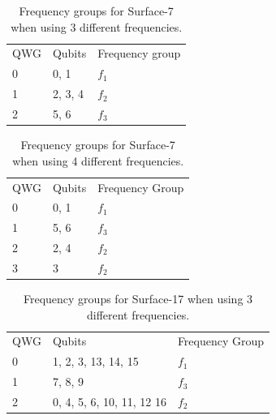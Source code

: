 \begin{table}[h!]


\caption{\label{T1}
Frequency groups for Surface-7 when using 3 different frequencies. }
\centering

\begin{tabular}{lll}
 & \\
\hline
QWG & Qubits & Frequency group\\
\hline
\cellcolor{red!25}  0 & \cellcolor{red!25} 0, 1 & \cellcolor{red!25} $f_1$\\
\cellcolor{Aquamarine!25}  1 & \cellcolor{Aquamarine!25} 2, 3, 4 & \cellcolor{Aquamarine!25} $f_2$\\
\cellcolor{pink!25}  2 & \cellcolor{pink!25} 5, 6 & \cellcolor{pink!25} $f_3$\\

\hline
\end{tabular}
\end{table}

 
 \begin{table}[h!]


\caption{\label{T2}
Frequency groups for Surface-7 when using 4 different frequencies.}
\centering
\begin{tabular}{lll}
 & \\
\hline
QWG & Qubits & Frequency Group\\
\hline
\cellcolor{red!25}  0 & \cellcolor{red!25} 0, 1 & \cellcolor{red!25} $f_1$ \\
\cellcolor{pink!25}  1 & \cellcolor{pink!25} 5, 6 & \cellcolor{pink!25} $f_3$ \\
\cellcolor{green!25}  2 & \cellcolor{green!25} 2, 4 & \cellcolor{green!25} $f_2$ \\
\cellcolor{cyan!25}  3 & \cellcolor{cyan!25} 3 & \cellcolor{cyan!25} $f_2$ \\
\hline
\end{tabular}
\end{table}
 
 
 





\begin{table}[h!]

\caption{\label{T4}
Frequency groups for Surface-17 when using 3 different frequencies.}
\centering
\begin{tabular}{lll}
 & \\
\hline
QWG & Qubits & Frequency Group\\
\hline
\cellcolor{red!25}  0 & \cellcolor{red!25} 1, 2, 3, 13, 14, 15 & \cellcolor{red!25} $f_1$\\
\cellcolor{pink!25}  1 & \cellcolor{pink!25} 7, 8, 9 & \cellcolor{pink!25} $f_3$\\
\cellcolor{Aquamarine!25}  2 & \cellcolor{Aquamarine!25} 0, 4, 5, 6, 10, 11, 12 16 & \cellcolor{Aquamarine!25} $f_2$\\
\hline
\end{tabular}
\end{table}


